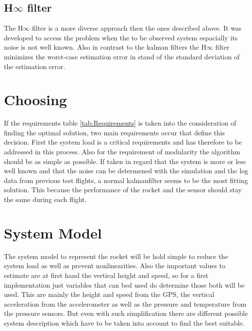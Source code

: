   \subsection{H$\infty$ filter}
  The H$\infty$ filter is a more diverse approach then the ones described above.
  It was developed to access the problem when the to be observed system espacially its noise is not well known.
  Also in contrast to the kalman filters the H$\infty$ filter minimizes the worst-case estimation error 
  in stand of the standard deviation of the estimation error.
  
  \section{Choosing}
  If the requirements table \ref{tab:Requirements} is taken into the consideration of finding
  the optimal solution, two main requirements occur that define this decision.
  First the system load is a critical requirements and has therefore to be addressed in this process.
  Also for the requirement of modularity the algorithm should be as simple as possible.
  If taken in regard that the system is more or less well known and that the noise can be
  determened with the simulation and the log data from previous test flights,
  a normal kalmanfilter seems to be the most fitting solution.
  This because the performance of the rocket and the sensor should stay the same during
  each flight. 
  
  \section{System Model}
  The system model to represent the rocket
  will be hold simple to reduce the system load as well as prevent nonlinearities.
  Also the important values to estimate are at first hand the vertical height and speed, so
  for a first implementation just variables that can bed used do determine those both will be used.
  This are mainly the height and speed from the GPS, the vertical acceleration from the accelerometer
  as well as the pressure and temperature from the pressure sensors.
  But even with such simplification there are different possible system description which have to be taken into account 
  to find the best suitable.
  
